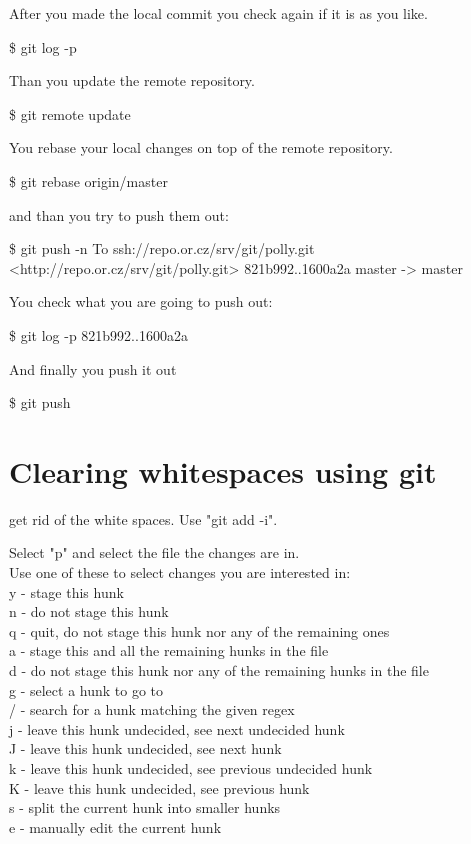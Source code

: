 \documentclass[a4paper,10pt]{article}
\begin{document}
   After you made the local commit you check again if it is as you like.

   \$ git log -p

   Than you update the remote repository.

   \$ git remote update

   You rebase your local changes on top of the remote repository.

   \$ git rebase origin/master

   and than you try to push them out:


   \$ git push -n
   To ssh://repo.or.cz/srv/git/polly.git
   <http://repo.or.cz/srv/git/polly.git>
   821b992..1600a2a  master -> master

   You check what you are going to push out:

   \$ git log -p 821b992..1600a2a

   And finally you push it out

   \$ git push



\section{Clearing whitespaces using git}

get rid of the white spaces. Use "git add -i".

    Select "p" and select the file the changes are in. \\
    Use one of these to select changes you are interested in:\\
    y - stage this hunk\\
    n - do not stage this hunk\\
    q - quit, do not stage this hunk nor any of the remaining ones\\
    a - stage this and all the remaining hunks in the file\\
    d - do not stage this hunk nor any of the remaining hunks in the file\\
    g - select a hunk to go to\\
    / - search for a hunk matching the given regex\\
    j - leave this hunk undecided, see next undecided hunk\\
    J - leave this hunk undecided, see next hunk\\
    k - leave this hunk undecided, see previous undecided hunk\\
    K - leave this hunk undecided, see previous hunk\\
    s - split the current hunk into smaller hunks\\
    e - manually edit the current hunk\\
\end{document}
